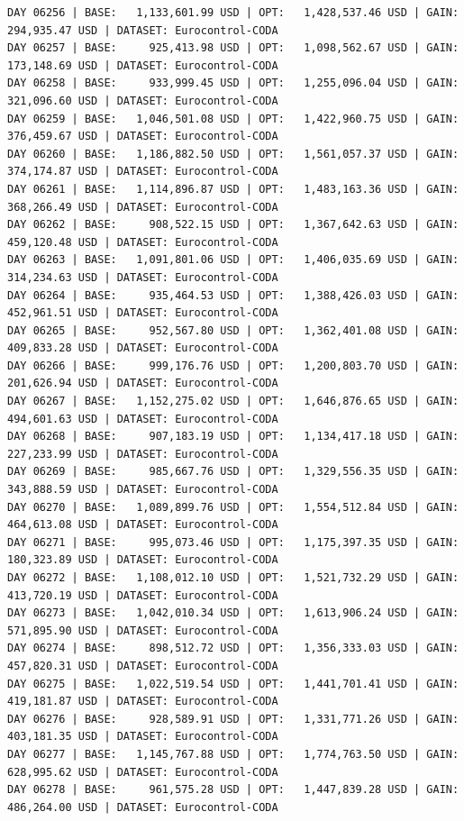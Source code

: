 \documentclass[11pt,a4paper]{article}
\begin{document}
\begin{verbatim}
DAY 06256 | BASE:   1,133,601.99 USD | OPT:   1,428,537.46 USD | GAIN: 294,935.47 USD | DATASET: Eurocontrol-CODA
DAY 06257 | BASE:     925,413.98 USD | OPT:   1,098,562.67 USD | GAIN: 173,148.69 USD | DATASET: Eurocontrol-CODA
DAY 06258 | BASE:     933,999.45 USD | OPT:   1,255,096.04 USD | GAIN: 321,096.60 USD | DATASET: Eurocontrol-CODA
DAY 06259 | BASE:   1,046,501.08 USD | OPT:   1,422,960.75 USD | GAIN: 376,459.67 USD | DATASET: Eurocontrol-CODA
DAY 06260 | BASE:   1,186,882.50 USD | OPT:   1,561,057.37 USD | GAIN: 374,174.87 USD | DATASET: Eurocontrol-CODA
DAY 06261 | BASE:   1,114,896.87 USD | OPT:   1,483,163.36 USD | GAIN: 368,266.49 USD | DATASET: Eurocontrol-CODA
DAY 06262 | BASE:     908,522.15 USD | OPT:   1,367,642.63 USD | GAIN: 459,120.48 USD | DATASET: Eurocontrol-CODA
DAY 06263 | BASE:   1,091,801.06 USD | OPT:   1,406,035.69 USD | GAIN: 314,234.63 USD | DATASET: Eurocontrol-CODA
DAY 06264 | BASE:     935,464.53 USD | OPT:   1,388,426.03 USD | GAIN: 452,961.51 USD | DATASET: Eurocontrol-CODA
DAY 06265 | BASE:     952,567.80 USD | OPT:   1,362,401.08 USD | GAIN: 409,833.28 USD | DATASET: Eurocontrol-CODA
DAY 06266 | BASE:     999,176.76 USD | OPT:   1,200,803.70 USD | GAIN: 201,626.94 USD | DATASET: Eurocontrol-CODA
DAY 06267 | BASE:   1,152,275.02 USD | OPT:   1,646,876.65 USD | GAIN: 494,601.63 USD | DATASET: Eurocontrol-CODA
DAY 06268 | BASE:     907,183.19 USD | OPT:   1,134,417.18 USD | GAIN: 227,233.99 USD | DATASET: Eurocontrol-CODA
DAY 06269 | BASE:     985,667.76 USD | OPT:   1,329,556.35 USD | GAIN: 343,888.59 USD | DATASET: Eurocontrol-CODA
DAY 06270 | BASE:   1,089,899.76 USD | OPT:   1,554,512.84 USD | GAIN: 464,613.08 USD | DATASET: Eurocontrol-CODA
DAY 06271 | BASE:     995,073.46 USD | OPT:   1,175,397.35 USD | GAIN: 180,323.89 USD | DATASET: Eurocontrol-CODA
DAY 06272 | BASE:   1,108,012.10 USD | OPT:   1,521,732.29 USD | GAIN: 413,720.19 USD | DATASET: Eurocontrol-CODA
DAY 06273 | BASE:   1,042,010.34 USD | OPT:   1,613,906.24 USD | GAIN: 571,895.90 USD | DATASET: Eurocontrol-CODA
DAY 06274 | BASE:     898,512.72 USD | OPT:   1,356,333.03 USD | GAIN: 457,820.31 USD | DATASET: Eurocontrol-CODA
DAY 06275 | BASE:   1,022,519.54 USD | OPT:   1,441,701.41 USD | GAIN: 419,181.87 USD | DATASET: Eurocontrol-CODA
DAY 06276 | BASE:     928,589.91 USD | OPT:   1,331,771.26 USD | GAIN: 403,181.35 USD | DATASET: Eurocontrol-CODA
DAY 06277 | BASE:   1,145,767.88 USD | OPT:   1,774,763.50 USD | GAIN: 628,995.62 USD | DATASET: Eurocontrol-CODA
DAY 06278 | BASE:     961,575.28 USD | OPT:   1,447,839.28 USD | GAIN: 486,264.00 USD | DATASET: Eurocontrol-CODA

\end{verbatim}
\end{document}
